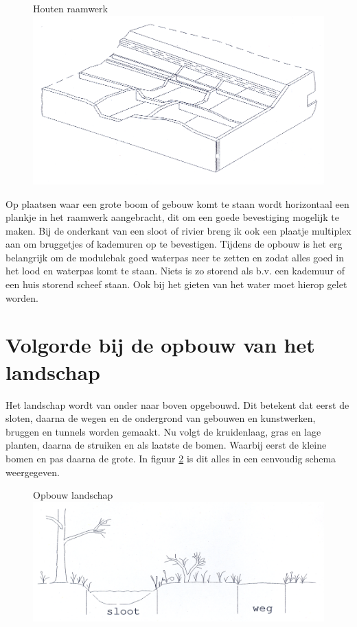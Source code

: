 \documentclass[12pt,a4paper]{report}
\begin{document}
\begin{figure}[ht]
  \captionbox
  {Houten raamwerk\label{figuur11}}
  {\includegraphics[scale=1.0]{images/rcu_figuur11}}
\end{figure}

Op plaatsen waar een grote boom of gebouw komt te staan wordt horizontaal een plankje in het raamwerk aangebracht, dit om een goede bevestiging mogelijk te maken.
Bij de onderkant van een sloot of rivier breng ik ook een plaatje multiplex aan om bruggetjes of kademuren op te bevestigen. Tijdens de opbouw is het erg belangrijk om de modulebak goed waterpas neer te zetten en zodat alles goed in het lood en waterpas komt te staan. Niets is zo storend als b.v. een kademuur of een huis storend scheef staan. Ook bij het gieten van het water moet hierop gelet worden.

\section{Volgorde bij de opbouw van het landschap}

Het landschap wordt van onder naar boven opgebouwd.
Dit betekent dat eerst de sloten, daarna de wegen en de ondergrond van gebouwen en kunstwerken, bruggen en tunnels worden gemaakt.
Nu volgt de kruidenlaag, gras en lage planten, daarna de struiken en als laatste de bomen.
Waarbij eerst de kleine bomen en pas daarna de grote.
In figuur \ref{figuur12} is dit alles in een eenvoudig schema weergegeven.

\begin{figure}[ht]
  \captionbox
  {Opbouw landschap\label{figuur12}}
  {\includegraphics[scale=1.0]{images/rcu_figuur12}}
\end{figure}
\end{document}
